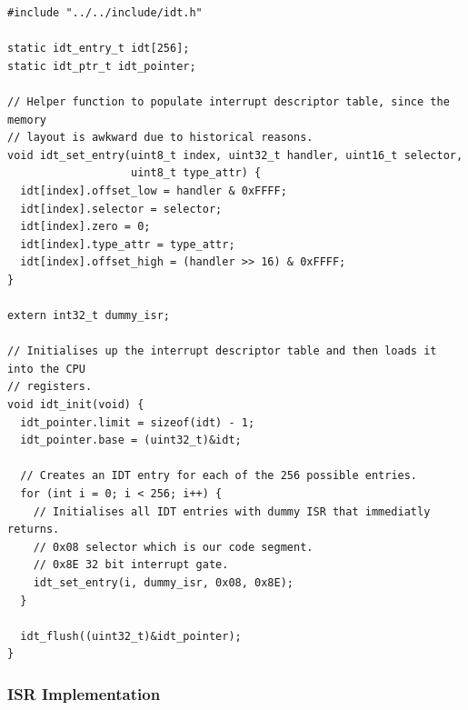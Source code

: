 \documentclass[../main.tex]{subfiles}
\begin{document}
\begin{listing}[H]
    \begin{verbatim}
#include "../../include/idt.h"

static idt_entry_t idt[256];
static idt_ptr_t idt_pointer;

// Helper function to populate interrupt descriptor table, since the memory
// layout is awkward due to historical reasons.
void idt_set_entry(uint8_t index, uint32_t handler, uint16_t selector,
                   uint8_t type_attr) {
  idt[index].offset_low = handler & 0xFFFF;
  idt[index].selector = selector;
  idt[index].zero = 0;
  idt[index].type_attr = type_attr;
  idt[index].offset_high = (handler >> 16) & 0xFFFF;
}

extern int32_t dummy_isr;

// Initialises up the interrupt descriptor table and then loads it into the CPU
// registers.
void idt_init(void) {
  idt_pointer.limit = sizeof(idt) - 1;
  idt_pointer.base = (uint32_t)&idt;

  // Creates an IDT entry for each of the 256 possible entries.
  for (int i = 0; i < 256; i++) {
    // Initialises all IDT entries with dummy ISR that immediatly returns.
    // 0x08 selector which is our code segment.
    // 0x8E 32 bit interrupt gate.
    idt_set_entry(i, dummy_isr, 0x08, 0x8E);
  }

  idt_flush((uint32_t)&idt_pointer);
}
    \end{verbatim}
    \caption{Implementation of \texttt{idt.c}}
    \label{lst:idt_c}
\end{listing}


\subsubsection{ISR Implementation}
\label{apx:isr_implementation}
\end{document}
